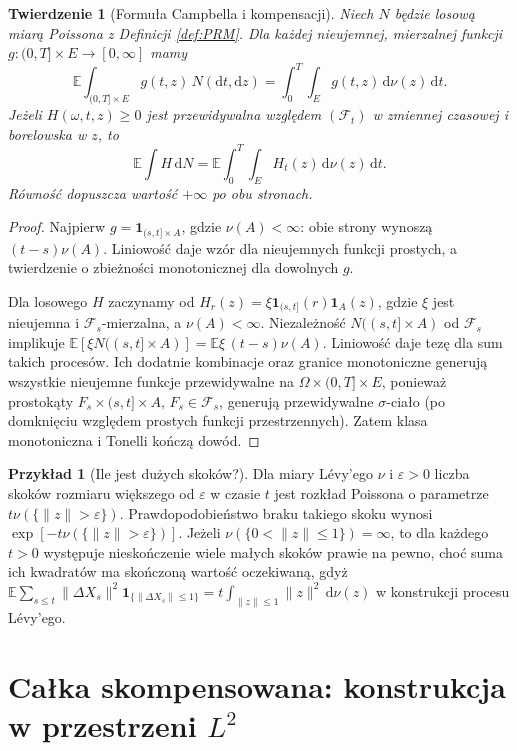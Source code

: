 \documentclass[11pt,a4paper,oneside]{report}
\numberwithin{equation}{chapter}
\theoremstyle{plain}
\newtheorem{twierdzenie}{Twierdzenie}[chapter]
\theoremstyle{definition}
\newtheorem{przyklad}{Przykład}[chapter]
\theoremstyle{remark}
\newcommand{\E}{\mathbb{E}}
\newcommand{\calF}{\mathcal{F}}
\newcommand{\ind}[1]{\mathbf{1}_{#1}}
\newcommand{\dd}{\mathrm{d}}
\begin{document}
\begin{twierdzenie}[Formuła Campbella i kompensacji]
\label{th:campbell}
Niech $N$ będzie losową miarą Poissona z Definicji
\ref{def:PRM}. Dla każdej nieujemnej, mierzalnej funkcji
$g:(0,T]\times E\to[0,\infty]$ mamy
\[
\E\int_{(0,T]\times E}g(t,z)\,N(\dd t,\dd z)
=\int_0^T\int_Eg(t,z)\,\dd\nu(z)\,\dd t.
\]
Jeżeli $H(\omega,t,z)\ge0$ jest przewidywalna względem
$(\calF_t)$ w zmiennej czasowej i borelowska w $z$, to
\[
\E\int H\,\dd N
=\E\int_0^T\int_E H_t(z)\,\dd\nu(z)\,\dd t.
\tag{11.1}\label{eq:compensation}
\]
Równość dopuszcza wartość $+\infty$ po obu stronach.
\end{twierdzenie}
\begin{proof}
Najpierw $g=\ind{(s,t]\times A}$, gdzie $\nu(A)<\infty$:
obie strony wynoszą $(t-s)\nu(A)$. Liniowość daje
wzór dla nieujemnych funkcji prostych, a twierdzenie o
zbieżności monotonicznej dla dowolnych $g$.

Dla losowego $H$ zaczynamy od
$H_r(z)=\xi\ind{(s,t]}(r)\ind A(z)$, gdzie $\xi$ jest
nieujemna i $\calF_s$-mierzalna, a $\nu(A)<\infty$.
Niezależność $N((s,t]\times A)$ od $\calF_s$ implikuje
$\E[\xi N((s,t]\times A)]=\E\xi\,(t-s)\nu(A)$.
Liniowość daje tezę dla sum takich procesów. Ich dodatnie
kombinacje oraz granice monotoniczne generują wszystkie
nieujemne funkcje przewidywalne na
$\Omega\times(0,T]\times E$, ponieważ prostokąty
$F_s\times(s,t]\times A$, $F_s\in\calF_s$,
generują przewidywalne $\sigma$-ciało (po domknięciu
względem prostych funkcji przestrzennych). Zatem
klasa monotoniczna i Tonelli kończą dowód.
\end{proof}

\begin{przyklad}[Ile jest dużych skoków?]
Dla miary Lévy'ego $\nu$ i $\varepsilon>0$ liczba skoków
rozmiaru większego od $\varepsilon$ w czasie $t$ jest
rozkład Poissona o parametrze $t\nu(\{\|z\|>\varepsilon\})$.
Prawdopodobieństwo braku takiego skoku wynosi
$\exp[-t\nu(\{\|z\|>\varepsilon\})]$.
Jeżeli $\nu(\{0<\|z\|\le1\})=\infty$, to dla każdego
$t>0$ występuje nieskończenie wiele małych skoków
prawie na pewno, choć suma ich kwadratów ma skończoną
wartość oczekiwaną, gdyż
$\E\sum_{s\le t}\|\Delta X_s\|^2\ind{\{\|\Delta X_s\|\le1\}}
=t\int_{\|z\|\le1}\|z\|^2\,\dd\nu(z)$ w konstrukcji
procesu Lévy'ego.
\end{przyklad}

\section[Całka skompensowana: konstrukcja w L2]{Całka skompensowana: konstrukcja w przestrzeni $L^2$}
\end{document}
